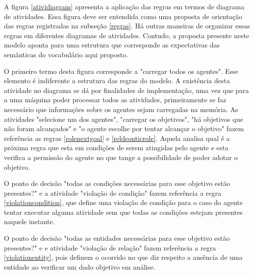 A figura \ref{atividiagram} apresenta a aplicação das regras em termos de diagrama de atividades. Essa figura deve ser entendida como uma proposta de orientação das regras registradas na subseção \ref{regras}. Há outras maneiras de organizar essas regras em diferentes diagramas de atividades. Contudo, a proposta presente neste modelo aponta para uma estrutura que corresponde as expectativas das semânticas do vocabulário aqui proposto.

O primeiro termo desta figura corresponde a "carregar todos os agentes". Esse elemento é indiferente a estrutura das regras do modelo. A existência desta atividade no diagrama se dá por finalidades de implementação, uma vez que para a uma máquina poder processar todos as atividades, primeiramente se faz necessário que informações sobre os agentes sejam carregadas na memória. As atividades "selecione um dos agentes", "carregar os objetivos", "há objetivos que não foram alcançados" e "o agente escolhe por tentar alcançar o objetivo" fazem referência as regras \ref{rolenextgoal} e \ref{reldeonticrole}. Aquela analisa qual é a próxima regra que esta em condições de serem atingidas pelo agente e esta verifica a permissão do agente no que tange a possibilidade de poder adotar o objetivo. 

O ponto de decisão "todas as condições necessárias para esse objetivo estão presentes?" e a atividade "violação de condição" fazem referência a regra \ref{violationcondition}, que define uma violação de condição para o caso do agente tentar executar alguma atividade sem que todas as condições estejam presentes naquele instante.

O ponto de decisão "todas as entidades necessárias para esse objetivo estão presentes?" e e atividade "violação de relação" fazem referência a regra \ref{violationentity}, pois definem o ocorrido no que diz respeito a ausência de uma entidade ao verificar um dado objetivo em análise. 

